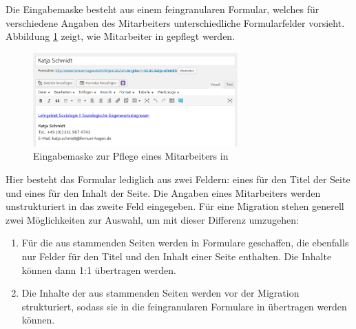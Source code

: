         Die Eingabemaske besteht aus einem feingranularen Formular,
        welches für verschiedene Angaben des Mitarbeiters unterschiedliche Formularfelder
        vorsieht.
        Abbildung \ref{image:introductionFernUniWordpressForm} zeigt,
        wie Mitarbeiter in {\wordpress} gepflegt werden.

        \begin{figure}[htb]
            \centering
            \includegraphics[width=0.7\textwidth]{../resources/wordpress/teachers.png}
            \caption{Eingabemaske zur Pflege eines Mitarbeiters in {\wordpress}}
            \label{image:introductionFernUniWordpressForm}
        \end{figure}
        
        Hier besteht das Formular lediglich aus zwei Feldern:
        eines für den Titel der Seite und eines für den Inhalt der Seite.
        Die Angaben eines Mitarbeiters werden unstrukturiert in das zweite Feld eingegeben.
        Für eine Migration stehen generell zwei Möglichkeiten zur Auswahl,
        um mit dieser Differenz umzugehen:

        \begin{enumerate}
            \item   Für die aus {\wordpress} stammenden Seiten werden in {\imperia} Formulare geschaffen,
                    die ebenfalls nur Felder für den Titel und den Inhalt einer Seite enthalten.
                    Die Inhalte können dann 1:1 übertragen werden.
            \item   Die Inhalte der aus {\wordpress} stammenden Seiten werden vor der Migration strukturiert,
                    sodass sie in die feingranularen Formulare in {\imperia} übertragen werden können.
        \end{enumerate}

